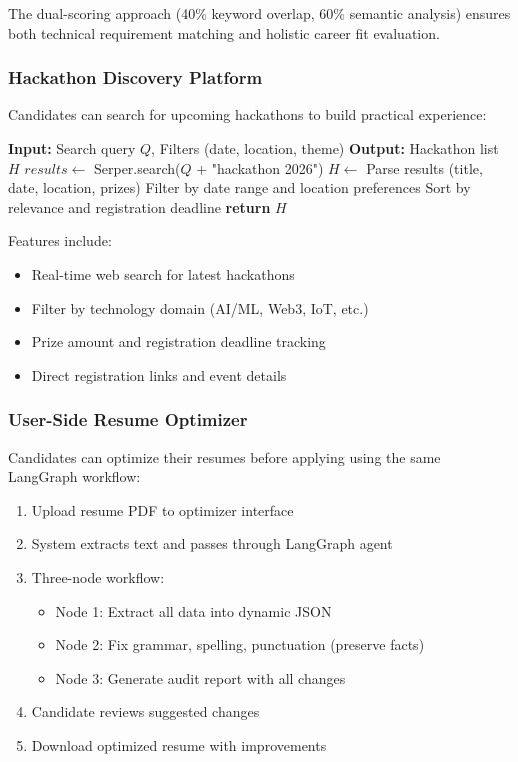 \documentclass[conference]{IEEEtran}
\begin{document}
The dual-scoring approach (40\% keyword overlap, 60\% semantic analysis) ensures both technical requirement matching and holistic career fit evaluation.

\subsubsection{Hackathon Discovery Platform}

Candidates can search for upcoming hackathons to build practical experience:

\begin{algorithm}[h]
\caption{Hackathon Search}
\label{alg:hackathon_search}
\begin{algorithmic}[1]
\STATE \textbf{Input:} Search query $Q$, Filters (date, location, theme)
\STATE \textbf{Output:} Hackathon list $H$
\STATE
\STATE $results \leftarrow$ Serper.search($Q$ + "hackathon 2026")
\STATE $H \leftarrow$ Parse results (title, date, location, prizes)
\STATE Filter by date range and location preferences
\STATE Sort by relevance and registration deadline
\STATE \textbf{return} $H$
\end{algorithmic}
\end{algorithm}

Features include:
\begin{itemize}
    \item Real-time web search for latest hackathons
    \item Filter by technology domain (AI/ML, Web3, IoT, etc.)
    \item Prize amount and registration deadline tracking
    \item Direct registration links and event details
\end{itemize}

\subsubsection{User-Side Resume Optimizer}

Candidates can optimize their resumes before applying using the same LangGraph workflow:

\begin{enumerate}
    \item Upload resume PDF to optimizer interface
    \item System extracts text and passes through LangGraph agent
    \item Three-node workflow:
    \begin{itemize}
        \item Node 1: Extract all data into dynamic JSON
        \item Node 2: Fix grammar, spelling, punctuation (preserve facts)
        \item Node 3: Generate audit report with all changes
    \end{itemize}
    \item Candidate reviews suggested changes
    \item Download optimized resume with improvements
\end{enumerate}
\end{document}
